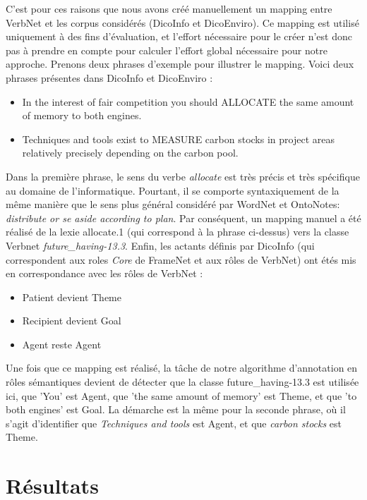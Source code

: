 C'est pour ces raisons que nous avons créé manuellement un mapping entre
VerbNet et les corpus considérés (DicoInfo et DicoEnviro). Ce mapping est
utilisé uniquement à des fins d'évaluation, et l'effort nécessaire pour le
créer n'est donc pas à prendre en compte pour calculer l'effort global
nécessaire pour notre approche. Prenons deux phrases d'exemple pour illustrer
le mapping. Voici deux phrases présentes dans DicoInfo et DicoEnviro :

\begin{itemize}
    \item In the interest of fair competition you should ALLOCATE the same amount of memory to both engines.
    \item Techniques and tools exist to MEASURE carbon stocks in project areas relatively precisely depending on the carbon pool.
\end{itemize}

Dans la première phrase, le sens du verbe \textit{allocate} est très précis et
très spécifique au domaine de l'informatique. Pourtant, il se comporte
syntaxiquement de la même manière que le sens plus général considéré par
WordNet et OntoNotes: \textit{distribute or se aside according to plan}. Par
conséquent, un mapping manuel a été réalisé de la lexie allocate.1 (qui
correspond à la phrase ci-dessus) vers la classe Verbnet
\textit{future\_having-13.3}. Enfin, les actants définis par DicoInfo (qui
correspondent aux roles \textit{Core} de FrameNet et aux rôles de VerbNet) ont
étés mis en correspondance avec les rôles de VerbNet :

\begin{itemize}
    \item Patient devient Theme
    \item Recipient devient Goal
    \item Agent reste Agent
\end{itemize}

Une fois que ce mapping est réalisé, la tâche de notre algorithme d'annotation
en rôles sémantiques devient de détecter que la classe future\_having-13.3 est
utilisée ici, que 'You' est Agent, que 'the same amount of memory' est Theme,
et que 'to both engines' est Goal. La démarche est la même pour la seconde
phrase, où il s'agit d'identifier que \textit{Techniques and tools} est Agent,
et que \textit{carbon stocks} est Theme.

\section{Résultats}
